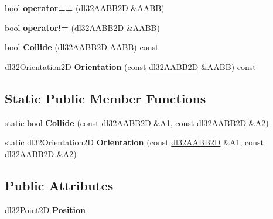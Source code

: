 \begin{DoxyCompactItemize}
\item 
\hypertarget{classdl32_a_a_b_b2_d_a9372192e5c142ae17f0b78120b94b2eb}{bool {\bfseries operator==} (\hyperlink{classdl32_a_a_b_b2_d}{dl32\-A\-A\-B\-B2\-D} \&A\-A\-B\-B)}\label{classdl32_a_a_b_b2_d_a9372192e5c142ae17f0b78120b94b2eb}

\item 
\hypertarget{classdl32_a_a_b_b2_d_ae768ae337f902f1a67f54a7023164847}{bool {\bfseries operator!=} (\hyperlink{classdl32_a_a_b_b2_d}{dl32\-A\-A\-B\-B2\-D} \&A\-A\-B\-B)}\label{classdl32_a_a_b_b2_d_ae768ae337f902f1a67f54a7023164847}

\item 
\hypertarget{classdl32_a_a_b_b2_d_abea689bbd9f7505f9b5f6e485e3e5702}{bool {\bfseries Collide} (\hyperlink{classdl32_a_a_b_b2_d}{dl32\-A\-A\-B\-B2\-D} A\-A\-B\-B) const }\label{classdl32_a_a_b_b2_d_abea689bbd9f7505f9b5f6e485e3e5702}

\item 
\hypertarget{classdl32_a_a_b_b2_d_aabe8bea2acd279e06c6c05f05223b32c}{dl32\-Orientation2\-D {\bfseries Orientation} (const \hyperlink{classdl32_a_a_b_b2_d}{dl32\-A\-A\-B\-B2\-D} \&A\-A\-B\-B) const }\label{classdl32_a_a_b_b2_d_aabe8bea2acd279e06c6c05f05223b32c}

\end{DoxyCompactItemize}
\subsection*{Static Public Member Functions}
\begin{DoxyCompactItemize}
\item 
\hypertarget{classdl32_a_a_b_b2_d_a46bd29b159cf5c65689969a21231897d}{static bool {\bfseries Collide} (const \hyperlink{classdl32_a_a_b_b2_d}{dl32\-A\-A\-B\-B2\-D} \&A1, const \hyperlink{classdl32_a_a_b_b2_d}{dl32\-A\-A\-B\-B2\-D} \&A2)}\label{classdl32_a_a_b_b2_d_a46bd29b159cf5c65689969a21231897d}

\item 
\hypertarget{classdl32_a_a_b_b2_d_aea78e60185f4ad29d5e609c479b78935}{static dl32\-Orientation2\-D {\bfseries Orientation} (const \hyperlink{classdl32_a_a_b_b2_d}{dl32\-A\-A\-B\-B2\-D} \&A1, const \hyperlink{classdl32_a_a_b_b2_d}{dl32\-A\-A\-B\-B2\-D} \&A2)}\label{classdl32_a_a_b_b2_d_aea78e60185f4ad29d5e609c479b78935}

\end{DoxyCompactItemize}
\subsection*{Public Attributes}
\begin{DoxyCompactItemize}
\item 
\hypertarget{classdl32_a_a_b_b2_d_a3718f0877a3755ec4b624fb1c682b77c}{\hyperlink{structdl32_point2_d}{dl32\-Point2\-D} {\bfseries Position}}\label{classdl32_a_a_b_b2_d_a3718f0877a3755ec4b624fb1c682b77c}

\end{DoxyCompactItemize}
